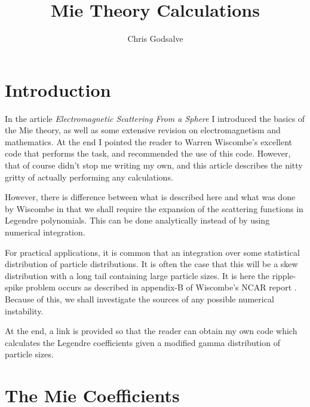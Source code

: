 \setlength{\textheight}{9.80in}
\setlength{\textwidth}{6.40in}
\setlength{\oddsidemargin}{0.0mm}
\setlength{\evensidemargin}{1.0mm}
\setlength{\topmargin}{-0.6in}
\setlength{\parindent}{0.2in}
\setlength{\parskip}{1.5ex}
\newtheorem{defn}{Definition}
\renewcommand{\baselinestretch}{1.2}






\thispagestyle{empty}

\title{Mie Theory Calculations}
\author{Chris Godsalve}
\maketitle

\tableofcontents


\section{Introduction}

In the article {\it Electromagnetic Scattering From a Sphere} \cite{EMScatt:Mybib} I 
introduced the basics of the Mie theory, as well as some extensive revision on 
electromagnetism and mathematics. At the end I pointed the reader to Warren Wiscombe's 
excellent code that performs the task, and recommended the use of this code. 
However, that of course didn't stop me writing my own, and this article 
describes the nitty gritty of actually performing any calculations. 

However, there is difference between what is described here and what was 
done by Wiscombe in that we shall require the expansion of the scattering 
functions in Legendre polynomials. 
This can be done analytically  instead of by using numerical integration. 

For practical applications, it is common that an integration over some 
statistical distribution of particle distributions.
It is often the case that this will be a skew distribution with a long tail containing large
 particle sizes. It is here
the ripple-spike problem occurs as described in appendix-B of Wiscombe's NCAR report \cite{WisRep:Mybib}.
 Because of this, we shall investigate the sources of any possible numerical instability.

At the end, a link is provided so that the reader can obtain my own code which calculates the Legendre coefficients
given a modified gamma distribution of particle sizes.

\section{The Mie Coefficients}

